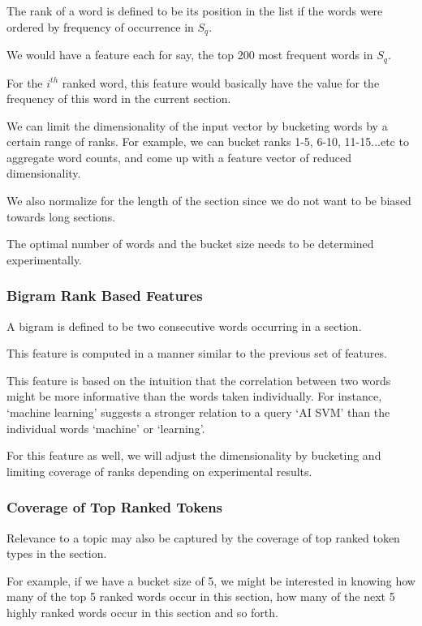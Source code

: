 \documentclass[10pt,a4paper]{report}
\begin{document}
The rank of a word is defined to be its position in the list if the words were ordered by frequency of occurrence in \textbf{$S_{q}$}\cite{squint}.

We would have a feature each for say, the top 200 most frequent words in \textbf{$S_{q}$}. 

For the $i^{th}$ ranked word, this feature would basically have the value for the frequency of this word in the current section. 

We can limit the dimensionality of the input vector by bucketing words by a certain range of ranks. 
For example, we can bucket ranks 1-5, 6-10, 11-15...etc to aggregate word counts, and come up with a feature vector of reduced dimensionality. 

We also normalize for the length of the section since we do not want to be biased towards long sections.

The optimal number of words and the bucket size needs to be determined experimentally.

\subsubsection {Bigram Rank Based Features}

A bigram is defined to be two consecutive words occurring in a section\cite{squint}.

This feature is computed in a manner similar to the previous set of features. 

This feature is based on the intuition that the correlation between two words might be more informative than the words taken individually. For instance, `machine learning' suggests a stronger relation to a query `AI SVM' than the
individual words `machine' or `learning'. 

For this feature as well, we will adjust the dimensionality by bucketing and limiting coverage of ranks depending on experimental results.

\subsubsection {Coverage of Top Ranked Tokens}

Relevance to a topic may also be captured by the coverage of top ranked token types in the section\cite{squint}.

For example, if we have a bucket size of 5, we might be interested in knowing how many of the top 5 ranked words occur in this section, how many of the next 5 highly ranked words occur in this section and so forth. 
\end{document}

